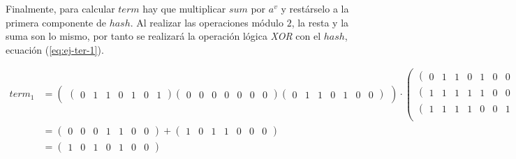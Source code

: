 Finalmente, para calcular $term$ hay que multiplicar $sum$ por $a^v$ y restárselo a la primera componente de $hash$. Al realizar las operaciones módulo $2$, la resta y la suma son lo mismo, por tanto se realizará la operación lógica \textit{XOR} con el $hash$, ecuación (\ref{eq:ej-ter-1}).

\begin{equation}\label{eq:ej-ter-1}
	\begin{split}
	{term_1} &= 
		\left(\begin{matrix}
			\left(\begin{smallmatrix}0 & 1 & 1 & 0 & 1 & 0 & 1\end{smallmatrix}\right)			
			\left(\begin{smallmatrix}0 & 0 & 0 & 0 & 0 & 0 & 0\end{smallmatrix}\right)
			\left(\begin{smallmatrix}0 & 1 & 1 & 0 & 1 & 0 & 0\end{smallmatrix}\right)
		\end{matrix}\right) \cdot 
		\left(\begin{matrix}
			\left(\begin{smallmatrix}0 & 1 & 1 & 0 & 1 & 0 & 0\end{smallmatrix}\right)\\
			\left(\begin{smallmatrix}1 & 1 & 1 & 1 & 1 & 0 & 0\end{smallmatrix}\right)\\
			\left(\begin{smallmatrix}1 & 1 & 1 & 1 & 0 & 0 & 1\end{smallmatrix}\right)\\
		\end{matrix}\right)
		+ \left(\begin{smallmatrix}1 & 0 & 1 & 1 & 0 & 0 & 0\end{smallmatrix}\right)\\
		&= \left(\begin{smallmatrix}0 & 0 & 0 & 1 & 1 & 0 & 0\end{smallmatrix}\right) + 
		\left(\begin{smallmatrix}1 & 0 & 1 & 1 & 0 & 0 & 0\end{smallmatrix}\right)\\
		& = \left(\begin{smallmatrix}1 & 0 & 1 & 0 & 1 & 0 & 0\end{smallmatrix}\right)
	\end{split}
\end{equation}


